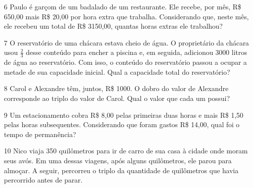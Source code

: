 {{{%

\num{6} Paulo é garçom de um badalado de um restaurante. Ele recebe, por mês,
R\$ 650,00 mais R\$ 20,00 por hora extra que trabalha. Considerando que,
neste mês, ele recebeu um total de R\$ 3150,00, quantas horas extras ele 
trabalhou?



\num{7} O reservatório de uma chácara estava cheio de água. O proprietário 
da chácara usou $\frac{2}{3}$ desse conteúdo para encher a piscina e, em seguida,
adicionou 3000 litros de água ao reservatório. Com isso, o conteúdo do
reservatório passou a ocupar a metade de sua capacidade inicial. Qual a
capacidade total do reservatório?



\num{8} Carol e Alexandre têm, juntos, R\$ 1000. O dobro do
valor de Alexandre corresponde ao triplo do valor de Carol. Qual o valor
que cada um possui?



\num{9} Um estacionamento cobra R\$ 8,00 pelas primeiras duas horas e mais
R\$ 1,50 pelas horas subsequentes. Considerando que foram gastos R\$
14,00, qual foi o tempo de permanência?



\num{10} Nico viaja 350 quilômetros para ir de carro de sua casa à cidade
onde moram seus avós. Em uma dessas viagens, após alguns quilômetros,
ele parou para almoçar. A seguir, percorreu o triplo da quantidade de
quilômetros que havia percorrido antes de parar.

}}}
